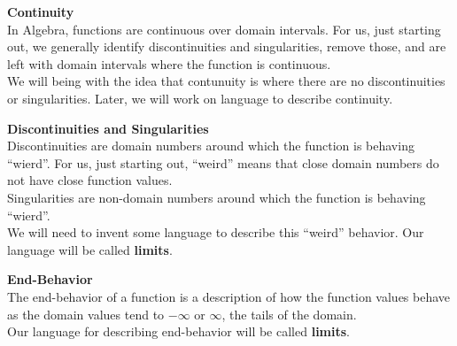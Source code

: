 \documentclass{ximera}
\begin{document}
\begin{explanation}  \textbf{\textcolor{blue!75!black}{Continuity}} \\

In Algebra, functions are continuous over domain intervals.  For us, just starting out, we generally identify discontinuities and singularities, remove those, and are left with domain intervals where the function is continuous. \\


We will being with the idea that contunuity is where there are no discontinuities or singularities.  Later, we will work on language to describe continuity.





\textbf{\textcolor{blue!75!black}{Discontinuities and Singularities}} \\

Discontinuities are domain numbers around which the function is behaving ``wierd''. For us, just starting out, ``weird'' means that close domain numbers do not have close function values.   \\




Singularities are non-domain numbers around which the function is behaving ``wierd''.   \\


We will need to invent some language to describe this ``weird'' behavior.  Our language will be called \textbf{limits}.





\end{explanation}







\begin{explanation}  \textbf{\textcolor{blue!75!black}{End-Behavior}} \\

The end-behavior of a function is a description of how the function values behave as the domain values tend to $-\infty$ or $\infty$, the tails of the domain. \\


Our language for describing end-behavior will be called \textbf{limits}.

\end{explanation}
\end{document}
